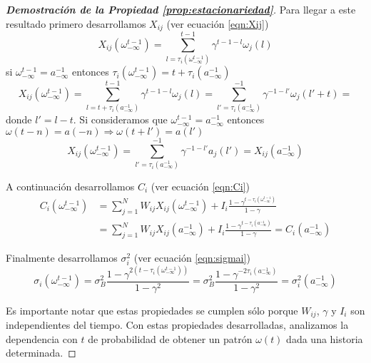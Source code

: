 \begin{proof}[\bf{Demostración de la Propiedad \ref{prop:estacionariedad}}]
Para llegar a este resultado primero desarrollamos $X_{ij}$ (ver ecuación \eqref{eqn:Xij})
\begin{equation*}
    X_{ij}(\omega_{-\infty}^{t-1}) = \sum_{l=\tau_i(\omega_{-\infty}^{t-1})}^{t-1} \gamma^{t-1-l} \omega_j(l)
\end{equation*}
si $\omega_{-\infty}^{t-1} = a_{-\infty}^{-1}$ entonces $\tau_i(\omega_{-\infty}^{t-1}) = t + \tau_i(a_{-\infty}^{-1})$
\begin{equation*}
    X_{ij}(\omega_{-\infty}^{t-1}) = 
    \sum_{l=t + \tau_i(a_{-\infty}^{-1})}^{t-1} \gamma^{t-1-l} \omega_j(l) = 
    \sum_{l'= \tau_i(a_{-\infty}^{-1})}^{-1} \gamma^{-1-l'} \omega_j(l'+t) =
\end{equation*}
donde $l'=l-t$. Si consideramos que $\omega_{-\infty}^{t-1} = a_{-\infty}^{-1}$ entonces $\omega(t-n)=a(-n) \Rightarrow \omega(t+l') = a(l')$
\begin{equation}
    X_{ij}(\omega_{-\infty}^{t-1}) = 
    \sum_{l'= \tau_i(a_{-\infty}^{-1})}^{-1} \gamma^{-1-l'} a_j(l') = X_{ij}(a_{-\infty}^{-1})
\end{equation}

A continuación desarrollamos $C_i$ (ver ecuación \eqref{eqn:Ci})
\begin{align}
\nonumber    C_i(\omega_{-\infty}^{t-1}) &= \sum_{j=1}^N W_{ij} X_{ij}(\omega_{-\infty}^{t-1}) + I_i \frac{1-\gamma^{t-\tau_i(\omega_{-\infty}^{t-1})}}{1-\gamma} \\
    &= \sum_{j=1}^N W_{ij} X_{ij}(a_{-\infty}^{-1}) + I_i \frac{1-\gamma^{t-\tau_i(a_{-\infty}^{-1})}}{1-\gamma} = C_i(a_{-\infty}^{-1})
\end{align}

Finalmente desarrollamos $\sigma_i^2$ (ver ecuación \eqref{eqn:sigmai})
\begin{equation}
  \sigma_i(\omega_{-\infty}^{t-1})= \sigma_B^2 \frac{1-\gamma^{2(t-\tau_i(\omega_{-\infty}^{t-1}))}}{1-\gamma^2} = \sigma_B^2 \frac{1-\gamma^{-2 \tau_i(a_{-\infty}^{-1})}}{1-\gamma^2} = \sigma_i^2(a_{-\infty}^{-1})
\end{equation}

Es importante notar que estas propiedades se cumplen sólo porque $W_{ij}$, $\gamma$ y $I_i$ son independientes del tiempo. Con estas propiedades desarrolladas, analizamos la dependencia con $t$ de probabilidad de obtener un patrón $\omega(t)$ dada una historia determinada.


\end{proof}
